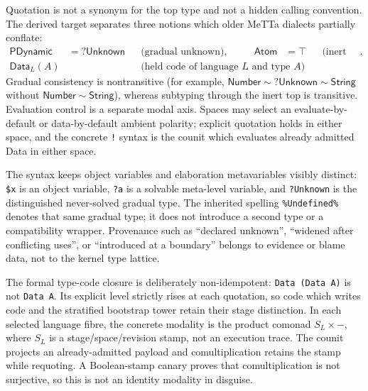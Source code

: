 \documentclass[11pt]{article}
\newcommand{\code}[1]{\texttt{#1}}
\begin{document}
Quotation is not a synonym for the top type and not a hidden calling convention.
The derived target separates three notions which older MeTTa dialects partially
conflate:
\[
\begin{aligned}
  \mathsf{PDynamic}&= \mathsf{?Unknown} &&\text{(gradual unknown)},&
  \mathsf{Atom}&=\top &&\text{(inert value top)},\\
  \mathsf{Data}_{L}(A)& &&\text{(held code of language $L$ and type $A$)}.
\end{aligned}
\]
Gradual consistency is nontransitive (for example,
$\mathsf{Number}\sim\mathsf{?Unknown}\sim\mathsf{String}$ without
$\mathsf{Number}\sim\mathsf{String}$), whereas subtyping through the inert top is
transitive.  Evaluation control is a separate modal axis.  Spaces may select an
evaluate-by-default or data-by-default ambient polarity; explicit quotation holds
in either space, and the concrete \code{!} syntax is the counit which evaluates already
admitted Data in either space.

The syntax keeps object variables and elaboration metavariables visibly
distinct: \code{\$x} is an object variable, \code{?a} is a solvable meta-level
variable, and \code{?Unknown} is the distinguished never-solved gradual type.
The inherited spelling \code{\%Undefined\%} denotes that same gradual type; it
does not introduce a second type or a compatibility wrapper.  Provenance such as
``declared unknown'', ``widened after conflicting uses'', or ``introduced at a
boundary'' belongs to evidence or blame data, not to the kernel type lattice.

The formal type-code closure is deliberately non-idempotent:
\code{Data (Data A)} is not \code{Data A}.  Its explicit level strictly rises at
each quotation, so code which writes code and the stratified bootstrap tower retain
their stage distinction.  In each selected language fibre, the concrete modality
is the product comonad $S_L\times-$, where $S_L$ is a stage/space/revision stamp,
not an execution trace.  The counit projects an already-admitted payload and
comultiplication retains the stamp while requoting.  A Boolean-stamp canary proves
that comultiplication is not surjective, so this is not an identity modality in
disguise.
\end{document}
